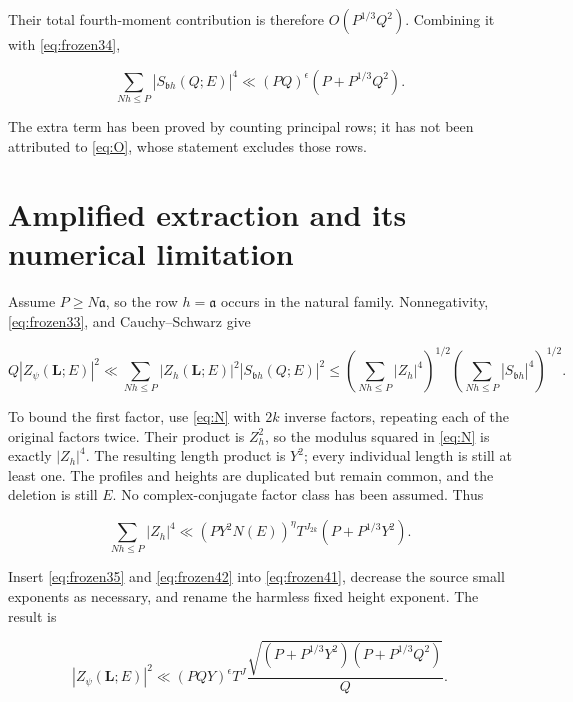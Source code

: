 \documentclass[11pt]{article}
\theoremstyle{remark}\newtheorem{remark}[theorem]{Remark}
\begin{document}
Their total fourth-moment contribution is therefore \(O(P^{1/3}Q^2)\). Combining it with \eqref{eq:frozen34},

\begin{equation}
\sum_{Nh\le P}|S_{\mathfrak b h}(Q;E)|^4
\ll(PQ)^\epsilon(P+P^{1/3}Q^2).
\label{eq:frozen35}
\end{equation}

The extra term has been proved by counting principal rows; it has not been attributed to \eqref{eq:O}, whose statement excludes those rows.

\section{Amplified extraction and its numerical limitation}\label{amplified-extraction-and-its-numerical-limitation}

Assume \(P\ge N\mathfrak a\), so the row \(h=\mathfrak a\) occurs in the natural family. Nonnegativity, \eqref{eq:frozen33}, and Cauchy--Schwarz give

\begin{equation}
Q|Z_\psi(\mathbf L;E)|^2
\ll\sum_{Nh\le P}|Z_h(\mathbf L;E)|^2|S_{\mathfrak b h}(Q;E)|^2
\le\left(\sum_{Nh\le P}|Z_h|^4\right)^{1/2}
\left(\sum_{Nh\le P}|S_{\mathfrak b h}|^4\right)^{1/2}.
\label{eq:frozen41}
\end{equation}

To bound the first factor, use \eqref{eq:N} with \(2k\) inverse factors, repeating each of the original factors twice. Their product is \(Z_h^2\), so the modulus squared in \eqref{eq:N} is exactly \(|Z_h|^4\). The resulting length product is \(Y^2\); every individual length is still at least one. The profiles and heights are duplicated but remain common, and the deletion is still \(E\). No complex-conjugate factor class has been assumed. Thus

\begin{equation}
\sum_{Nh\le P}|Z_h|^4
\ll(PY^2N(E))^\eta T^{J_{2k}}(P+P^{1/3}Y^2).
\label{eq:frozen42}
\end{equation}

Insert \eqref{eq:frozen35} and \eqref{eq:frozen42} into \eqref{eq:frozen41}, decrease the source small exponents as necessary, and rename the harmless fixed height exponent. The result is

\begin{equation}
|Z_\psi(\mathbf L;E)|^2
\ll(PQY)^\epsilon T^J
\frac{\sqrt{(P+P^{1/3}Y^2)(P+P^{1/3}Q^2)}}{Q}.
\label{eq:frozenB}
\end{equation}
\end{document}
